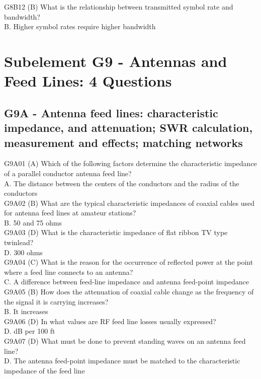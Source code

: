 \documentclass[12pt,letterpaper]{report}
\begin{document}
G8B12 (B) What is the relationship between transmitted symbol rate and bandwidth?\\
B. Higher symbol rates require higher bandwidth\\

\chapter{Subelement G9 - Antennas and Feed Lines: 4 Questions}
\section{G9A - Antenna feed lines: characteristic impedance, and attenuation; SWR calculation, measurement and effects; matching networks}
 
G9A01 (A) Which of the following factors determine the characteristic impedance of a parallel conductor antenna feed line?\\
A. The distance between the centers of the conductors and the radius of the
conductors\\

G9A02 (B) What are the typical characteristic impedances of coaxial cables used for antenna feed lines at amateur stations?\\
B. 50 and 75 ohms\\

G9A03 (D) What is the characteristic impedance of flat ribbon TV type twinlead?\\
D. 300 ohms\\

G9A04 (C) What is the reason for the occurrence of reflected power at the point where a feed line connects to an antenna?\\
C. A difference between feed-line impedance and antenna feed-point impedance\\

G9A05 (B) How does the attenuation of coaxial cable change as the frequency of the signal it is carrying increases?\\
B. It increases\\

G9A06 (D) In what values are RF feed line losses usually expressed?\\
D. dB per 100 ft\\

G9A07 (D) What must be done to prevent standing waves on an antenna feed line?\\
D. The antenna feed-point impedance must be matched to the characteristic impedance of the feed line\\
\end{document}
